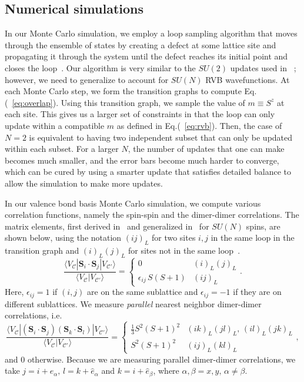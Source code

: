 \documentclass[11pt]{iopart}
\begin{document}
\subsection{Numerical simulations}
\label{sec:numerics}
In our Monte Carlo simulation, we employ a loop sampling algorithm that moves through the ensemble of states by creating a defect at some lattice site and propagating it through the system until the defect reaches its initial point and closes the loop~\cite{sandvik2010loop}. Our algorithm is very similar to the $SU(2)$ updates used in ~\cite{RVB2}; however, we need to generalize to account for $SU(N)$ RVB wavefunctions. At each Monte Carlo step, we form the transition graphs to compute Eq.(~\ref{eq:overlap}). Using this transition graph, we sample the value of $m \equiv S^z$ at each site. This gives us a larger set of constraints in that the loop can only update within a compatible $m$ as defined in Eq.(~\ref{eq:rvb}). Then, the case of $N=2$ is equivalent to having two independent subset that can only be updated within each subset. For a larger $N$, the number of updates that one can make becomes much smaller, and the error bars become much harder to converge, which can be cured by using a smarter update 
that satisfies detailed balance to allow the simulation to make more updates.

In our valence bond basis Monte Carlo simulation, we compute various correlation functions, namely the spin-spin and the dimer-dimer correlations. The matrix elements, first derived in~\cite{beach2006some} and generalized in~\cite{beach2009n} for $SU(N)$ spins, are shown below, using the notation $(ij)_L$ for two sites $i,j$ in the same loop in the transition graph and $(i)_L(j)_L$ for sites not in the same loop~\cite{RVB2}.
\[ 
\displaystyle
\frac{\langle V_\mathcal{C} | \mathbf{S}_i \cdot \mathbf{S}_j | V_{\mathcal{C}'} \rangle}{\langle V_\mathcal{C} | V_{\mathcal{C}'} \rangle} = \left\{ \begin{array}{ccc}
0 & (i)_L (j)_L\\
\epsilon_{ij} \, S (S+1) & (ij)_L   \end{array}. \right.
\] 
Here, $\epsilon_{ij} = 1$ if $(i,j)$ are on the same sublattice and $\epsilon_{ij} = -1$ if they are on different sublattices.
We measure \textit{parallel} nearest neighbor dimer-dimer correlations, i.e.
\[ 
\displaystyle
\frac{\langle V_\mathcal{C} | \left( \mathbf{S}_i \cdot \mathbf{S}_j \right) \left( \mathbf{S}_k \cdot \mathbf{S}_l  \right) | V_{\mathcal{C}'} \rangle}{\langle V_\mathcal{C} | V_{\mathcal{C}'} \rangle} = \left\{ \begin{array}{ccc}
\frac{1}{3} S^2 (S+1)^2 & (ik)_L (jl)_L, \,(il)_L (jk)_L\\
S^2 (S+1)^2 & (ij)_L (kl)_L \end{array}, \right.
\] 
and $0$ otherwise. Because we are measuring parallel dimer-dimer correlations, we take $j = i + \hat{e}_\alpha, \, l = k + \hat{e}_\alpha$ and $k = i + \hat{e}_\beta$, where $\alpha,\beta = x, y, \, \alpha \neq \beta$.
\end{document}
